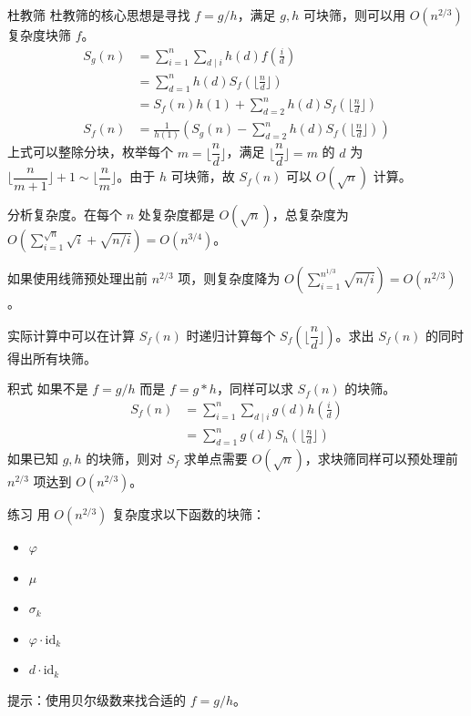 \documentclass [hyperref={bookmarksdepth=4}, aspectratio=169] {beamer}
\theoremstyle {fy}
\begin{document}
\begin{frame}{杜教筛}
杜教筛的核心思想是寻找 $f=g/h$，满足 $g,h$ 可块筛，则可以用 $O(n^{2/3})$ 复杂度块筛 $f$。
$$
\begin{aligned}
S_g(n)&=\sum_{i=1}^n\sum_{d\mid i}h(d)f(\frac{i}{d})\\
&=\sum_{d=1}^nh(d)S_f(\lfloor\frac{n}{d}\rfloor)\\
&=S_f(n)h(1)+\sum_{d=2}^nh(d)S_f(\lfloor\frac{n}{d}\rfloor)\\
S_f(n)&=\frac{1}{h(1)}(S_g(n)-\sum_{d=2}^nh(d)S_f(\lfloor\frac{n}{d} \rfloor))
\end{aligned}
$$
上式可以整除分块，枚举每个 $m=\lfloor\dfrac{n}{d}\rfloor$，满足 $\lfloor\dfrac{n}{d}\rfloor=m$ 的 $d$ 为 $\lfloor\dfrac{n}{m+1}\rfloor+1\sim\lfloor\dfrac{n}{m}\rfloor$。由于 $h$ 可块筛，故 $S_f(n)$ 可以 $O(\sqrt n)$ 计算。

分析复杂度。在每个 $n$ 处复杂度都是 $O(\sqrt n)$，总复杂度为 $O(\sum\limits_{i=1}^{\sqrt n}\sqrt i+\sqrt{n/i})=O(n^{3/4})$。

如果使用线筛预处理出前 $n^{2/3}$ 项，则复杂度降为 $O(\sum\limits_{i=1}^{n^{1/3}}\sqrt{n/i})=O(n^{2/3})$。

实际计算中可以在计算 $S_f(n)$ 时递归计算每个 $S_f(\lfloor\dfrac{n}{d}\rfloor)$。求出 $S_f(n)$ 的同时得出所有块筛。
\end{frame}

\begin{frame}{积式}
如果不是 $f=g/h$ 而是 $f=g*h$，同样可以求 $S_f(n)$ 的块筛。
$$
\begin{aligned}
S_f(n)&=\sum_{i=1}^n\sum_{d\mid i}g(d)h(\frac{i}{d})\\
&=\sum_{d=1}^ng(d)S_h(\lfloor\frac{n}{d}\rfloor)
\end{aligned}
$$
如果已知 $g,h$ 的块筛，则对 $S_f$ 求单点需要 $O(\sqrt n)$，求块筛同样可以预处理前 $n^{2/3}$ 项达到 $O(n^{2/3})$。
\end{frame}

\begin{frame}{练习}
用 $O(n^{2/3})$ 复杂度求以下函数的块筛：

\begin{itemize}
    \item $\varphi$
    \item $\mu$
    \item $\sigma_k$
    \item $\varphi\cdot \text{id}_k$
    \item $d\cdot \text{id}_k$
\end{itemize}

提示：使用贝尔级数来找合适的 $f=g/h$。
\end{frame}
\end{document}
